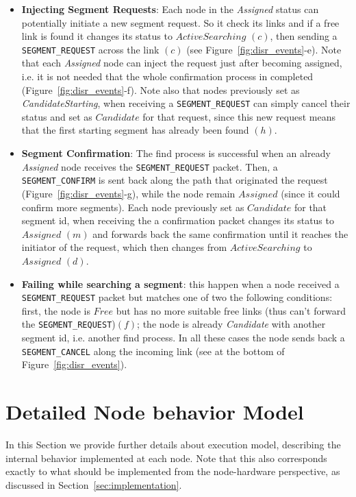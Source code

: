 \begin{itemize}
\item{\textbf{Injecting Segment Requests}}: Each node in the
\emph{Assigned} status can potentially initiate a new segment request.
So it check its links and if a free link is found it changes its
status to $ActiveSearching$ $(c)$, then sending
a \texttt{SEGMENT\_REQUEST} across the link $(c)$ (see
Figure~\ref{fig:disr_events}-e). 
Note that each \emph{Assigned} node can inject the request just after
becoming assigned, i.e. it is not needed that the whole confirmation
process in completed (Figure~\ref{fig:disr_events}-f).
Note also that nodes previously set as \emph{CandidateStarting}, when receiving 
a \texttt{SEGMENT\_REQUEST} can simply cancel their
status and set as $Candidate$ for that request, since this new
request means that the first starting segment has already been found $(h)$. 
\item{\textbf{Segment Confirmation}}: The find process is successful
when an already \emph{Assigned} node receives the
\texttt{SEGMENT\_REQUEST} packet. Then, a \texttt{SEGMENT\_CONFIRM} is
sent back along the path that originated the request
(Figure~\ref{fig:disr_events}-g), while the
node remain $Assigned$ (since it could confirm more segments). Each node
previously set as $Candidate$ for that segment id, when receiving the
a confirmation packet changes its status to $Assigned$ $(m)$ and forwards back
the same confirmation until it reaches the initiator of the request,
which then changes from $ActiveSearching$ to $Assigned$ $(d)$.

\item{\textbf{Failing while searching a segment}}: this happen when a node received a \texttt{SEGMENT\_REQUEST} packet but
matches one of two the following conditions: first, the node is $Free$ but has no
more suitable free links (thus can’t forward the
\texttt{SEGMENT\_REQUEST})$(f)$; the node
is already \emph{Candidate} with another segment id, i.e. another find
process.  In all these cases the node
sends back a \texttt{SEGMENT\_CANCEL} along the incoming link (see at
the bottom of Figure~\ref{fig:disr_events}).
\end{itemize}


\section{Detailed Node behavior Model}
\label{sec:execution_model}

In this Section we provide further details about \disr{}
execution model, describing the internal behavior implemented at
each node. Note that this also corresponds exactly to what should be
implemented from the node-hardware perspective, as discussed in
Section~\ref{sec:implementation}.

